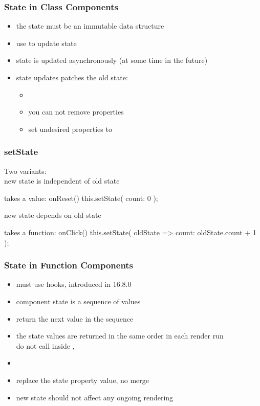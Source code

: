 \begin{frame}[fragile] \frametitle{State in Class Components}
\begin{itemize}
  \item the state must be an immutable data structure
  \item use  to update state
  \item state is updated asynchronously (at some time in the future)
  \item state updates patches the old state:
  \begin{itemize}
    \item {}
    \item you can not remove properties
    \item set undesired properties to 
  \end{itemize}
\end{itemize}
\end{frame}

\begin{frame}[fragile] \frametitle{setState}
Two variants:\\
new state is independent of old state
\begin{CodeBox}{ takes a value:}
onReset() {
  this.setState( {count: 0} );
}
\end{CodeBox}

new state depends on old state
\begin{CodeBox}{ takes a function:}
onClick() {
  this.setState(
    oldState => {count: oldState.count + 1}
);}
\end{CodeBox}

\end{frame}

\begin{frame}[fragile] \frametitle{State in Function Components}
\begin{itemize}
  \item must use hooks, introduced in 16.8.0
  \item component state is a sequence of values
  \item {} return the next value in the sequence
  \item the state values are returned in the same order in each render run
           \\do not call  inside , 
  \item {}
  \item {} replace the state property value, no merge
  \item new state should not affect any ongoing rendering
\end{itemize}
\end{frame}

